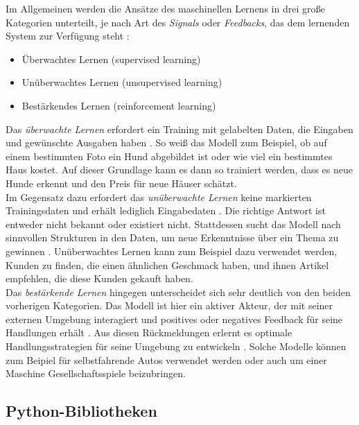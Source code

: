 \documentclass[german,bachelor]{swsLeipzig}
\begin{document}
Im Allgemeinen werden die Ansätze des maschinellen Lernens in drei große Kategorien unterteilt, je nach Art des \textit{Signals}
oder \textit{Feedbacks}, das dem lernenden System zur Verfügung steht \cite[S. 2]{cite-key}:
\begin{itemize}
 \item Überwachtes Lernen (supervised learning)
 \item Unüberwachtes Lernen (unsupervised learning)
 \item Bestärkendes Lernen (reinforcement learning)
\end{itemize}

Das \textit{überwachte Lernen} erfordert ein Training mit gelabelten Daten, die Eingaben und gewünschte Ausgaben haben \cite[S. 2]{cite-key}.
So weiß das Modell zum Beispiel, ob auf einem bestimmten Foto ein Hund abgebildet ist oder wie viel ein bestimmtes Haus kostet.
Auf dieser Grundlage kann es dann so trainiert werden, dass es neue Hunde erkennt und den Preis für neue Häuser schätzt. \\

Im Gegensatz dazu erfordert das \textit{unüberwachte Lernen} keine markierten Trainingsdaten und erhält lediglich Eingabedaten \cite[S. 2]{cite-key}.
Die richtige Antwort ist entweder nicht bekannt oder existiert nicht.
Stattdessen sucht das Modell nach sinnvollen Strukturen in den Daten, um neue Erkenntnisse über ein Thema zu gewinnen \cite[S. 383]{mahesh2020machine}.
Unüberwachtes Lernen kann zum Beispiel dazu verwendet werden, Kunden zu finden, die einen ähnlichen Geschmack haben,
und ihnen Artikel empfehlen, die diese Kunden gekauft haben. \\

Das \textit{bestärkende Lernen} hingegen unterscheidet sich sehr deutlich von den beiden vorherigen Kategorien.
Das Modell ist hier ein aktiver Akteur, der mit seiner externen Umgebung interagiert
und positives oder negatives Feedback für seine Handlungen erhält \cite[S. 2]{cite-key}.
Aus diesen Rückmeldungen erlernt es optimale Handlungsstrategien für seine Umgebung zu entwickeln \cite[S. 384]{mahesh2020machine}.
Solche Modelle können zum Beipiel für selbstfahrende Autos verwendet werden oder auch um einer Maschine Gesellschaftsspiele beizubringen.




\subsection{Python-Bibliotheken}
\end{document}
